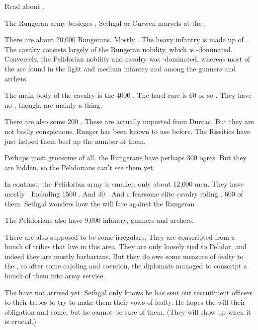 
\begin{comment}
  \section{The Rungerans come into view}
\end{comment}

Read about \Forclin. 

The Rungeran army besieges \Forklin. 
Sethgal or Curwen marvels at the . 

There are about 20,000 Rungerans. 
Mostly \humans. 
The heavy infantry is made up of \scathae. 
The cavalry consists largely of the Rungeran nobility, which is \human-dominated. 
Conversely, the Pelidorian nobility and cavalry was \scatha-dominated, whereas most of the \humans are found in the light and medium infantry and among the gunners and archers. 

The main body of the cavalry is the 4000 \relcers. 
The hard core is 60 or so \murocs. 
They have no \grulcans, though. 
\Grulcans are mainly a \Galessan thing.

There are also some 200 \mezolisks. 
These are actually imported from Durcac. 
But they are not badly conspicuous. 
Runger has been known to use \mezolisks{} before. 
The Rissitics have just helped them beef up the number of them. 

Perhaps most gruesome of all, the Rungerans have perhaps 300 \nephil ogres. 
But they are hidden, so the Pelidorians can't see them yet. 

In contrast, the Pelidorian army is smaller, only about 12,000 men. 
They have mostly \scathae. 
Including 1500 \relcers.
And 40 \murocs. 
And a fearsome elite cavalry riding \grulcans.
600 of them. 
Sethgal wonders how the \grulcans will fare against the Rungeran \mezolisks. 

The Pelidorians also have 9,000 infantry, gunners and archers. 

There are also supposed to be some \meccaran irregulars. 
They are conscripted from a bunch of tribes that live in this area. 
They are only loosely tied to Pelidor, and indeed they are mostly barbarians. 
But they do owe some measure of fealty to the \rayuth, so after some cajoling and coercion, the diplomats managed to conscript a bunch of them into army service. 

The \meccarans have not arrived yet. 
Sethgal only knows he has sent out recruitment officers to their tribes to try to make them \honour their vows of fealty. 
He hopes the \meccarans will \honour their obligation and come, but he cannot be sure of them. 
(They will show up when it is crucial.)

